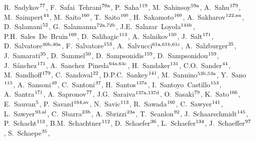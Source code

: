 \begin{flushleft}
R.~Sadykov$^\textrm{\scriptsize 77}$,    
F.~Safai~Tehrani$^\textrm{\scriptsize 70a}$,    
P.~Saha$^\textrm{\scriptsize 119}$,    
M.~Sahinsoy$^\textrm{\scriptsize 59a}$,    
A.~Sahu$^\textrm{\scriptsize 179}$,    
M.~Saimpert$^\textrm{\scriptsize 44}$,    
M.~Saito$^\textrm{\scriptsize 160}$,    
T.~Saito$^\textrm{\scriptsize 160}$,    
H.~Sakamoto$^\textrm{\scriptsize 160}$,    
A.~Sakharov$^\textrm{\scriptsize 122,an}$,    
D.~Salamani$^\textrm{\scriptsize 52}$,    
G.~Salamanna$^\textrm{\scriptsize 72a,72b}$,    
J.E.~Salazar~Loyola$^\textrm{\scriptsize 144b}$,    
P.H.~Sales~De~Bruin$^\textrm{\scriptsize 169}$,    
D.~Salihagic$^\textrm{\scriptsize 113}$,    
A.~Salnikov$^\textrm{\scriptsize 150}$,    
J.~Salt$^\textrm{\scriptsize 171}$,    
D.~Salvatore$^\textrm{\scriptsize 40b,40a}$,    
F.~Salvatore$^\textrm{\scriptsize 153}$,    
A.~Salvucci$^\textrm{\scriptsize 61a,61b,61c}$,    
A.~Salzburger$^\textrm{\scriptsize 35}$,    
J.~Samarati$^\textrm{\scriptsize 35}$,    
D.~Sammel$^\textrm{\scriptsize 50}$,    
D.~Sampsonidis$^\textrm{\scriptsize 159}$,    
D.~Sampsonidou$^\textrm{\scriptsize 159}$,    
J.~S\'anchez$^\textrm{\scriptsize 171}$,    
A.~Sanchez~Pineda$^\textrm{\scriptsize 64a,64c}$,    
H.~Sandaker$^\textrm{\scriptsize 131}$,    
C.O.~Sander$^\textrm{\scriptsize 44}$,    
M.~Sandhoff$^\textrm{\scriptsize 179}$,    
C.~Sandoval$^\textrm{\scriptsize 22}$,    
D.P.C.~Sankey$^\textrm{\scriptsize 141}$,    
M.~Sannino$^\textrm{\scriptsize 53b,53a}$,    
Y.~Sano$^\textrm{\scriptsize 115}$,    
A.~Sansoni$^\textrm{\scriptsize 49}$,    
C.~Santoni$^\textrm{\scriptsize 37}$,    
H.~Santos$^\textrm{\scriptsize 137a}$,    
I.~Santoyo~Castillo$^\textrm{\scriptsize 153}$,    
A.~Santra$^\textrm{\scriptsize 171}$,    
A.~Sapronov$^\textrm{\scriptsize 77}$,    
J.G.~Saraiva$^\textrm{\scriptsize 137a,137d}$,    
O.~Sasaki$^\textrm{\scriptsize 79}$,    
K.~Sato$^\textrm{\scriptsize 166}$,    
E.~Sauvan$^\textrm{\scriptsize 5}$,    
P.~Savard$^\textrm{\scriptsize 164,av}$,    
N.~Savic$^\textrm{\scriptsize 113}$,    
R.~Sawada$^\textrm{\scriptsize 160}$,    
C.~Sawyer$^\textrm{\scriptsize 141}$,    
L.~Sawyer$^\textrm{\scriptsize 93,al}$,    
C.~Sbarra$^\textrm{\scriptsize 23b}$,    
A.~Sbrizzi$^\textrm{\scriptsize 23a}$,    
T.~Scanlon$^\textrm{\scriptsize 92}$,    
J.~Schaarschmidt$^\textrm{\scriptsize 145}$,    
P.~Schacht$^\textrm{\scriptsize 113}$,    
B.M.~Schachtner$^\textrm{\scriptsize 112}$,    
D.~Schaefer$^\textrm{\scriptsize 36}$,    
L.~Schaefer$^\textrm{\scriptsize 134}$,    
J.~Schaeffer$^\textrm{\scriptsize 97}$,    
S.~Schaepe$^\textrm{\scriptsize 35}$,    

\end{flushleft}
